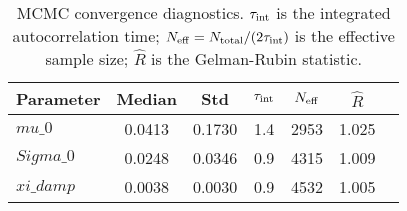 \begin{table}[t]
\centering
\caption{MCMC convergence diagnostics. $\tau_{\rm int}$ is the integrated autocorrelation time; $N_{\rm eff} = N_{\rm total}/(2\tau_{\rm int})$ is the effective sample size; $\hat{R}$ is the Gelman-Rubin statistic.}
\label{tab:convergence}
\begin{tabular}{lcccccc}
\hline
Parameter & Median & Std & $\tau_{\rm int}$ & $N_{\rm eff}$ & $\hat{R}$ \\
\hline
$mu\_0$ & 0.0413 & 0.1730 & 1.4 & 2953 & 1.025 \\
$Sigma\_0$ & 0.0248 & 0.0346 & 0.9 & 4315 & 1.009 \\
$xi\_damp$ & 0.0038 & 0.0030 & 0.9 & 4532 & 1.005 \\
\hline
\end{tabular}
\end{table}
